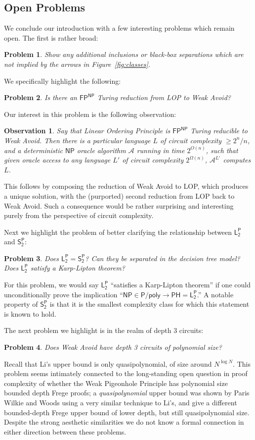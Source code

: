 \documentclass[11pt]{article}
\newtheorem{observation}{Observation}
\newtheorem{problem}{Problem}
\begin{document}
\subsection{Open Problems}\label{sec:open-probs}
We conclude our introduction with a few interesting problems which remain open. The first is rather broad:
\begin{problem}
Show any additional inclusions or black-box separations which are not implied by the arrows in Figure~\ref{fig:classes}.
\end{problem}
We specifically highlight the following:
\begin{problem}\label{prob:lop-to-avoid}
Is there an $\mathsf{FP^{NP}}$ Turing reduction from LOP to Weak Avoid?
\end{problem}
Our interest in this problem is the following observation:
\begin{observation}
Say that Linear Ordering Principle is $\mathsf{FP^{NP}}$ Turing reducible to Weak Avoid. Then there is a particular language $L$ of circuit complexity $\geq 2^n/n$, and a deterministic $\mathsf{NP}$ oracle algorithm $\mathcal{A}$ running in time $2^{O(n)}$, such that given oracle access to any language $L'$ of circuit complexity $2^{\Omega(n)}$, $\mathcal{A}^{L'}$ computes $L$.
\end{observation}
This follows by composing the reduction of Weak Avoid to LOP, which produces a unique solution, with the (purported) second reduction from LOP back to Weak Avoid. Such a consequence would be rather surprising and interesting purely from the perspective of circuit complexity.

Next we highlight the problem of better clarifying the relationship between $\mathsf{L_2^P}$ and $\mathsf{S_2^P}$:
\begin{problem}
Does $\mathsf{L_2^P} = \mathsf{S_2^P}$? Can they be separated in the decision tree model? Does $\mathsf{L_2^P}$ satisfy a Karp-Lipton theorem?
\end{problem}
For this problem, we would say $\mathsf{L_2^P}$ ``satisfies a Karp-Lipton theorem'' if one could unconditionally prove the implication ``$\mathsf{NP} \in \mathsf{P/poly} \rightarrow \mathsf{PH}=\mathsf{L_2^P}$.'' A notable property of $\mathsf{S_2^P}$ is that it is the smallest complexity class for which this statement is known to hold.

The next problem we highlight is in the realm of depth 3 circuits:
\begin{problem}
Does Weak Avoid have depth 3 circuits of polynomial size?
\end{problem}
Recall that Li's upper bound is only quasipolynomial, of size around $N^{\log N}$. This problem seems intimately connected to the long-standing open question in proof complexity of whether the Weak Pigeonhole Principle has polynomial size bounded depth Frege proofs; a \emph{quasipolynomial} upper bound was shown by Paris Wilkie and Woods \cite{Paris-Wilkie-Woods} using a very similar technique to Li's, and \cite{MacielPW02} give a different bounded-depth Frege upper bound of lower depth, but still quasipolynomial size. Despite the strong aesthetic similarities we do not know a formal connection in either direction between these problems.
\end{document}
